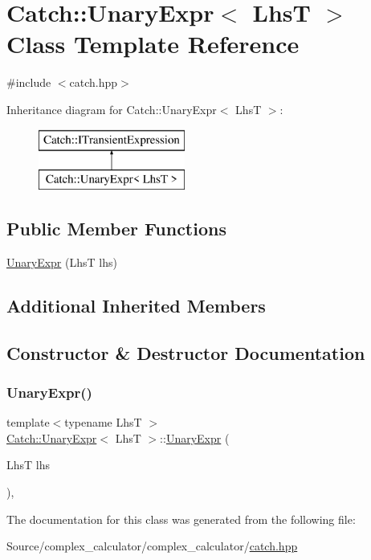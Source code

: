 \hypertarget{class_catch_1_1_unary_expr}{}\section{Catch\+:\+:Unary\+Expr$<$ LhsT $>$ Class Template Reference}
\label{class_catch_1_1_unary_expr}


{\ttfamily \#include $<$catch.\+hpp$>$}

Inheritance diagram for Catch\+:\+:Unary\+Expr$<$ LhsT $>$\+:\begin{figure}[H]
\begin{center}
\leavevmode
\includegraphics[height=2.000000cm]{class_catch_1_1_unary_expr}
\end{center}
\end{figure}
\subsection*{Public Member Functions}
\begin{DoxyCompactItemize}
\item 
\mbox{\hyperlink{class_catch_1_1_unary_expr_ae02f666a1e64da728628aa2033e1d6e7}{Unary\+Expr}} (LhsT lhs)
\end{DoxyCompactItemize}
\subsection*{Additional Inherited Members}


\subsection{Constructor \& Destructor Documentation}
\mbox{\label{class_catch_1_1_unary_expr_ae02f666a1e64da728628aa2033e1d6e7}} 
\subsubsection{\texorpdfstring{Unary\+Expr()}{UnaryExpr()}}
{\footnotesize\ttfamily template$<$typename LhsT $>$ \\
\mbox{\hyperlink{class_catch_1_1_unary_expr}{Catch\+::\+Unary\+Expr}}$<$ LhsT $>$\+::\mbox{\hyperlink{class_catch_1_1_unary_expr}{Unary\+Expr}} (\begin{DoxyParamCaption}\item[{LhsT}]{lhs }\end{DoxyParamCaption})\hspace{0.3cm}{\ttfamily [inline]}, {\ttfamily [explicit]}}



The documentation for this class was generated from the following file\+:\begin{DoxyCompactItemize}
\item 
Source/complex\+\_\+calculator/complex\+\_\+calculator/\mbox{\hyperlink{catch_8hpp}{catch.\+hpp}}\end{DoxyCompactItemize}
